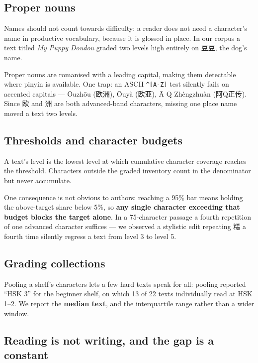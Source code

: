 \documentclass[11pt]{article}
\begin{document}
\subsection{Proper nouns}
\label{sec:propernouns}

Names should not count towards difficulty: a reader does not need a character's
name in productive vocabulary, because it is glossed in place. In our corpus a
text titled \emph{My Puppy Doudou} graded two levels high entirely on 豆豆, the
dog's name.

Proper nouns are romanised with a leading capital, making them detectable where
pinyin is available. One trap: an ASCII \verb|^[A-Z]| test silently fails on
accented capitals --- Ōuzhōu (欧洲), Ōuyà (欧亚), Ā Q Zhèngzhuàn (阿Q正传).
Since 欧 and 洲 are both advanced-band characters, missing one place name moved
a text two levels.

\subsection{Thresholds and character budgets}

A text's level is the lowest level at which cumulative character coverage
reaches the threshold. Characters outside the graded inventory count in the
denominator but never accumulate.

One consequence is not obvious to authors: reaching a 95\% bar means holding
the above-target share below 5\%, so \textbf{any single character exceeding
that budget blocks the target alone}. In a 75-character passage a fourth
repetition of one advanced character suffices --- we observed a stylistic edit
repeating 糕 a fourth time silently regress a text from level 3 to level 5.

\subsection{Grading collections}

Pooling a shelf's characters lets a few hard texts speak for all: pooling
reported ``HSK 3'' for the beginner shelf, on which 13 of 22 texts individually read at
HSK 1--2. We report the \textbf{median text}, and the interquartile range
rather than a wider window.

\subsection{Reading is not writing, and the gap is a constant}
\label{sec:writing}
\end{document}
